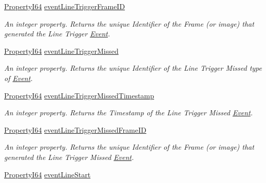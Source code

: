 \begin{DoxyCompactItemize}
\hyperlink{group___common_interface_ga81749b2696755513663492664a18a893}{Property\+I64} \hyperlink{classmv_i_m_p_a_c_t_1_1acquire_1_1_gen_i_cam_1_1_event_control_a61cdd8eb786178bcadfaf2576d608541}{event\+Line\+Trigger\+Frame\+I\+D}
\begin{DoxyCompactList}\small\item\em An integer property. Returns the unique Identifier of the Frame (or image) that generated the Line Trigger \hyperlink{classmv_i_m_p_a_c_t_1_1acquire_1_1_event}{Event}. \end{DoxyCompactList}\item 
\hyperlink{group___common_interface_ga81749b2696755513663492664a18a893}{Property\+I64} \hyperlink{classmv_i_m_p_a_c_t_1_1acquire_1_1_gen_i_cam_1_1_event_control_ad03c012e940d1df99bce895f7643b9a3}{event\+Line\+Trigger\+Missed}
\begin{DoxyCompactList}\small\item\em An integer property. Returns the unique Identifier of the Line Trigger Missed type of \hyperlink{classmv_i_m_p_a_c_t_1_1acquire_1_1_event}{Event}. \end{DoxyCompactList}\item 
\hyperlink{group___common_interface_ga81749b2696755513663492664a18a893}{Property\+I64} \hyperlink{classmv_i_m_p_a_c_t_1_1acquire_1_1_gen_i_cam_1_1_event_control_ae782caab71ec3f11cc9f9cbebc56c87d}{event\+Line\+Trigger\+Missed\+Timestamp}
\begin{DoxyCompactList}\small\item\em An integer property. Returns the Timestamp of the Line Trigger Missed \hyperlink{classmv_i_m_p_a_c_t_1_1acquire_1_1_event}{Event}. \end{DoxyCompactList}\item 
\hyperlink{group___common_interface_ga81749b2696755513663492664a18a893}{Property\+I64} \hyperlink{classmv_i_m_p_a_c_t_1_1acquire_1_1_gen_i_cam_1_1_event_control_ada6ae3b055ae892261d1a175489ec4b4}{event\+Line\+Trigger\+Missed\+Frame\+I\+D}
\begin{DoxyCompactList}\small\item\em An integer property. Returns the unique Identifier of the Frame (or image) that generated the Line Trigger Missed \hyperlink{classmv_i_m_p_a_c_t_1_1acquire_1_1_event}{Event}. \end{DoxyCompactList}\item 
\hyperlink{group___common_interface_ga81749b2696755513663492664a18a893}{Property\+I64} \hyperlink{classmv_i_m_p_a_c_t_1_1acquire_1_1_gen_i_cam_1_1_event_control_ac292ef609ac6d98f02b2b264293bdbc7}{event\+Line\+Start}

\end{DoxyCompactItemize}

